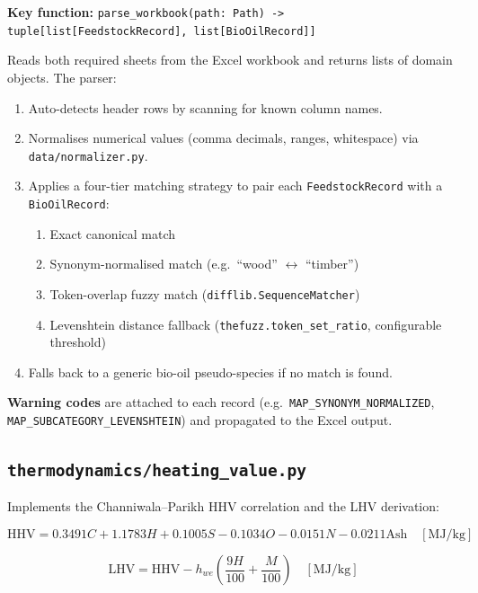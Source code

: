 \documentclass[12pt, a4paper]{article}
\begin{document}
\textbf{Key function:} \texttt{parse\_workbook(path: Path) -> tuple[list[FeedstockRecord], list[BioOilRecord]]}

Reads both required sheets from the Excel workbook and returns lists of domain objects. The parser:

\begin{enumerate}
    \item Auto-detects header rows by scanning for known column names.
    \item Normalises numerical values (comma decimals, ranges, whitespace) via \texttt{data/normalizer.py}.
    \item Applies a four-tier matching strategy to pair each \texttt{FeedstockRecord} with a \texttt{BioOilRecord}:
    \begin{enumerate}
        \item Exact canonical match
        \item Synonym-normalised match (e.g.\ ``wood'' $\leftrightarrow$ ``timber'')
        \item Token-overlap fuzzy match (\texttt{difflib.SequenceMatcher})
        \item Levenshtein distance fallback (\texttt{thefuzz.token\_set\_ratio}, configurable threshold)
    \end{enumerate}
    \item Falls back to a generic bio-oil pseudo-species if no match is found.
\end{enumerate}

\textbf{Warning codes} are attached to each record (e.g.\ \texttt{MAP\_SYNONYM\_NORMALIZED}, \texttt{MAP\_SUBCATEGORY\_LEVENSHTEIN}) and propagated to the Excel output.

\subsection{\texttt{thermodynamics/heating\_value.py}}

Implements the Channiwala--Parikh HHV correlation and the LHV derivation:

\begin{equation}
    \mathrm{HHV} = 0.3491C + 1.1783H + 0.1005S - 0.1034O - 0.0151N - 0.0211\mathrm{Ash} \quad [\mathrm{MJ/kg}]
\end{equation}

\begin{equation}
    \mathrm{LHV} = \mathrm{HHV} - h_{we}\left(\frac{9H}{100} + \frac{M}{100}\right) \quad [\mathrm{MJ/kg}]
\end{equation}
\end{document}
